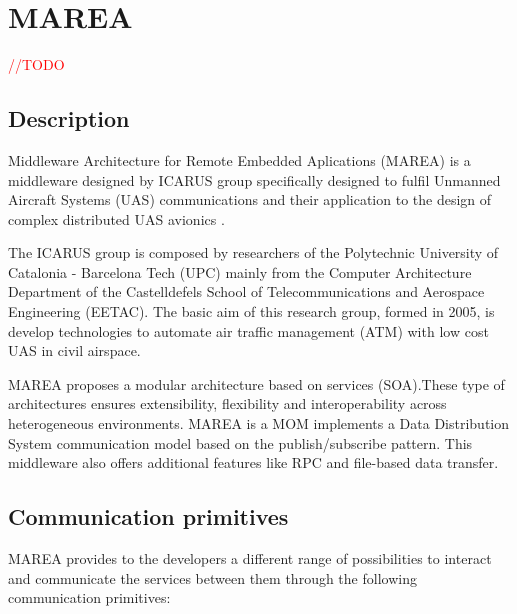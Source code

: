 \chapter{MAREA}\label{C:MAREA}

\textcolor{red}{//TODO}

\section{Description}\label{S:MAREA-description}

Middleware Architecture for Remote Embedded Aplications (MAREA) is a middleware designed by ICARUS group specifically designed to fulfil Unmanned Aircraft Systems (UAS) communications and their application to the design of complex distributed UAS avionics \cite{cite:marea}.

The ICARUS group is composed by researchers of the Polytechnic University of Catalonia - Barcelona Tech (UPC) mainly from the Computer Architecture Department of the Castelldefels School of Telecommunications and Aerospace Engineering (EETAC). The basic aim of this research group, formed in 2005, is develop technologies to automate air traffic management (ATM) with low cost UAS in civil airspace.

MAREA proposes a modular architecture based on services (SOA).These type of architectures ensures extensibility, flexibility and interoperability across heterogeneous environments. MAREA is a MOM implements a Data Distribution System communication model based on the publish/subscribe pattern. This middleware also offers additional features like RPC and file-based data transfer. 

\section{Communication primitives}\label{S:MAREA-primitives}

MAREA provides to the developers a different range of possibilities to interact and communicate the services between them through the following communication primitives:

